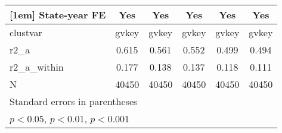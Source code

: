 {\begin{tabular}{l*{5}{c}}
[1em]
State-year FE&         Yes         &         Yes         &         Yes         &         Yes         &         Yes         \\
\hline
clustvar    &       gvkey         &       gvkey         &       gvkey         &       gvkey         &       gvkey         \\
r2\_a        &       0.615         &       0.561         &       0.552         &       0.499         &       0.494         \\
r2\_a\_within &       0.177         &       0.138         &       0.137         &       0.118         &       0.111         \\
N           &       40450         &       40450         &       40450         &       40450         &       40450         \\
\hline\hline
\multicolumn{6}{l}{\footnotesize Standard errors in parentheses}\\
\multicolumn{6}{l}{\footnotesize \sym{*} \(p<0.05\), \sym{**} \(p<0.01\), \sym{***} \(p<0.001\)}\\
\end{tabular}
}

